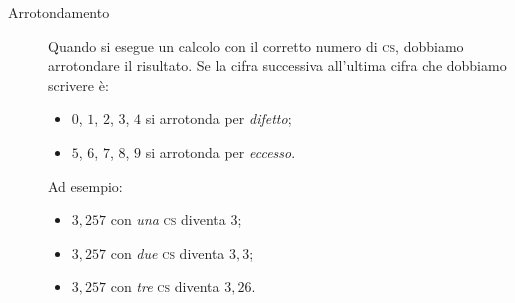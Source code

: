 \documentclass[a4paper,11pt,italian]{article}
\begin{document}
\begin{description}
  \item[Arrotondamento] Quando si esegue un calcolo con il corretto numero di \textsc{cs}, dobbiamo arrotondare il risultato. Se la cifra successiva all'ultima cifra che dobbiamo scrivere è:
  \begin{multicols}{2}
  \begin{itemize}
    \item $ 0 $, $ 1 $, $ 2 $, $ 3 $, $ 4 $ si arrotonda per \emph{difetto};
    \item $ 5 $, $ 6 $, $ 7 $, $ 8 $, $ 9 $ si arrotonda per \emph{eccesso}.
  \end{itemize}
  \end{multicols}
  Ad esempio:
  \begin{itemize}
    \item $ 3,257 $ con \emph{una} \textsc{cs} diventa $ 3 $;
    \item $ 3,257 $ con \emph{due} \textsc{cs} diventa $ 3,3 $;
    \item $ 3,257 $ con \emph{tre} \textsc{cs} diventa $ 3,26 $.
  \end{itemize}

%   
%   
%   
\end{description}
\end{document}

